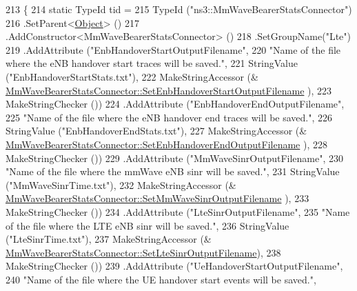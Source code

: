 \begin{DoxyCode}
213 \{
214   \textcolor{keyword}{static} TypeId tid =
215     TypeId (\textcolor{stringliteral}{"ns3::MmWaveBearerStatsConnector"}) 
216     .SetParent<\hyperlink{classns3_1_1Object_a40860402e64d8008fb42329df7097cdb}{Object}> ()
217     .AddConstructor<MmWaveBearerStatsConnector> ()
218     .SetGroupName(\textcolor{stringliteral}{"Lte"})
219     .AddAttribute (\textcolor{stringliteral}{"EnbHandoverStartOutputFilename"},
220                    \textcolor{stringliteral}{"Name of the file where the eNB handover start traces will be saved."},
221                    StringValue (\textcolor{stringliteral}{"EnbHandoverStartStats.txt"}),
222                    MakeStringAccessor (&
      \hyperlink{classns3_1_1MmWaveBearerStatsConnector_a336d57c3b6b0466d1a820c899659bedd}{MmWaveBearerStatsConnector::SetEnbHandoverStartOutputFilename}
      ),
223                    MakeStringChecker ())
224     .AddAttribute (\textcolor{stringliteral}{"EnbHandoverEndOutputFilename"},
225                    \textcolor{stringliteral}{"Name of the file where the eNB handover end traces will be saved."},
226                    StringValue (\textcolor{stringliteral}{"EnbHandoverEndStats.txt"}),
227                    MakeStringAccessor (&
      \hyperlink{classns3_1_1MmWaveBearerStatsConnector_a28b6a2167e875d2069e1881f3890df55}{MmWaveBearerStatsConnector::SetEnbHandoverEndOutputFilename}
      ),
228                    MakeStringChecker ())
229     .AddAttribute (\textcolor{stringliteral}{"MmWaveSinrOutputFilename"},
230                \textcolor{stringliteral}{"Name of the file where the mmWave eNB sinr will be saved."},
231                StringValue (\textcolor{stringliteral}{"MmWaveSinrTime.txt"}),
232                MakeStringAccessor (&
      \hyperlink{classns3_1_1MmWaveBearerStatsConnector_aab1415a6360f9d8056a1910619c05c89}{MmWaveBearerStatsConnector::SetMmWaveSinrOutputFilename}
      ),
233                MakeStringChecker ())
234     .AddAttribute (\textcolor{stringliteral}{"LteSinrOutputFilename"},
235                \textcolor{stringliteral}{"Name of the file where the LTE eNB sinr will be saved."},
236                StringValue (\textcolor{stringliteral}{"LteSinrTime.txt"}),
237                MakeStringAccessor (&
      \hyperlink{classns3_1_1MmWaveBearerStatsConnector_adc4fe400b56fdb3822e62911315fcb0d}{MmWaveBearerStatsConnector::SetLteSinrOutputFilename}),
238                MakeStringChecker ())
239     .AddAttribute (\textcolor{stringliteral}{"UeHandoverStartOutputFilename"},
240                    \textcolor{stringliteral}{"Name of the file where the UE handover start events will be saved."},

\end{DoxyCode}
